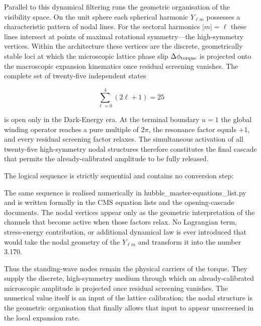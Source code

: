 Parallel to this dynamical filtering runs the geometric organisation of the visibility space. On the unit sphere each spherical harmonic \(Y_{\ell m}\) possesses a characteristic pattern of nodal lines. For the sectoral harmonics \(|m|=\ell\) these lines intersect at points of maximal rotational symmetry—the high-symmetry vertices. Within the architecture these vertices are the discrete, geometrically stable loci at which the microscopic lattice phase slip \(\Delta\phi_{\rm torque}\) is projected onto the macroscopic expansion kinematics once residual screening vanishes. The complete set of twenty-five independent states

\[
\sum_{\ell=0}^{4}(2\ell+1)=25
\]

is open only in the Dark-Energy era. At the terminal boundary \(u=1\) the global winding operator reaches a pure multiple of \(2\pi\), the resonance factor equals \(+1\), and every residual screening factor relaxes. The simultaneous activation of all twenty-five high-symmetry nodal structures therefore constitutes the final cascade that permits the already-calibrated amplitude to be fully released.

The logical sequence is strictly sequential and contains no conversion step:

The same sequence is realised numerically in hubble_master-equations_list.py and is written formally in the CMS equation lists and the opening-cascade documents. The nodal vertices appear only as the geometric interpretation of the channels that become active when those factors relax. No Lagrangian term, stress-energy contribution, or additional dynamical law is ever introduced that would take the nodal geometry of the \(Y_{\ell m}\) and transform it into the number 3.170.

Thus the standing-wave nodes remain the physical carriers of the torque. They supply the discrete, high-symmetry medium through which an already-calibrated microscopic amplitude is projected once residual screening vanishes. The numerical value itself is an input of the lattice calibration; the nodal structure is the geometric organisation that finally allows that input to appear unscreened in the local expansion rate.

